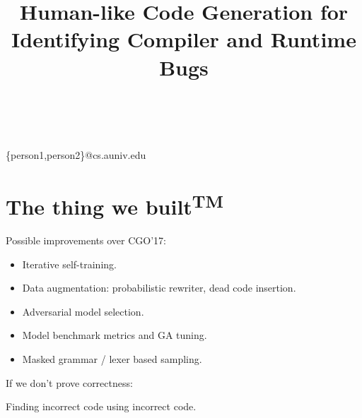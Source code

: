 


        
\title{Human-like Code Generation for Identifying Compiler and Runtime Bugs}

%
%
{ \\
          \\
        }
{\{person1,person2\}@cs.auniv.edu}

\maketitle






\section{The thing we built\textsuperscript{TM}}

Possible improvements over CGO'17:

\begin{itemize}
        \item Iterative self-training.
        \item Data augmentation: probabilistic rewriter, dead code insertion.
        \item Adversarial model selection.
        \item Model benchmark metrics and GA tuning.
        \item Masked grammar / lexer based sampling.
\end{itemize}

\noindent If we don't prove correctness:

Finding incorrect code using incorrect code.

